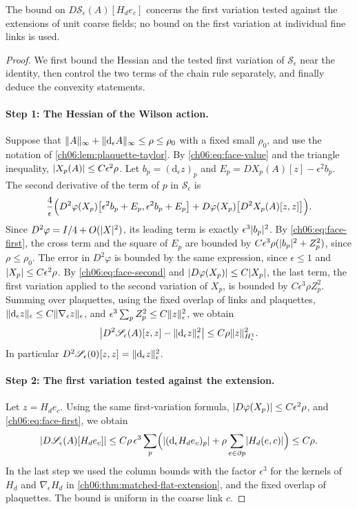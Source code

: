 The bound on $D\mathscr S_\epsilon(A)[H_de_c]$ concerns the first variation tested against the extensions of unit coarse fields; no bound on the first variation at individual fine links is used.

\begin{proof}
We first bound the Hessian and the tested first variation of $\mathscr S_\epsilon$ near the identity, then control the two terms of the chain rule separately, and finally deduce the convexity statements.

\paragraph{Step 1: The Hessian of the Wilson action.}
Suppose that $\lVert A\rVert_\infty+\lVert \mathrm d_\epsilon A\rVert_\infty\le\rho\le\rho_0$ with a fixed small $\rho_0$, and use the notation of \cref{ch06:lem:plaquette-taylor}. By \eqref{ch06:eq:face-value} and the triangle inequality, $\lvert X_p(A)\rvert\le C\epsilon^2\rho$. Let $b_p=(\mathrm d_\epsilon z)_p$ and $E_p=DX_p(A)[z]-\epsilon^2b_p$. The second derivative of the term of $p$ in $\mathscr S_\epsilon$ is
\[
 \frac4\epsilon\Bigl(D^2\varphi(X_p)\bigl[\epsilon^2b_p+E_p,\epsilon^2b_p+E_p\bigr]+D\varphi(X_p)\bigl[D^2X_p(A)[z,z]\bigr]\Bigr).
\]
Since $D^2\varphi=I/4+O(\lvert X\rvert^2)$, its leading term is exactly $\epsilon^3\lvert b_p\rvert^2$. By \eqref{ch06:eq:face-first}, the cross term and the square of $E_p$ are bounded by $C\epsilon^3\rho(\lvert b_p\rvert^2+Z_p^2)$, since $\rho\le\rho_0$. The error in $D^2\varphi$ is bounded by the same expression, since $\epsilon\le1$ and $\lvert X_p\rvert\le C\epsilon^2\rho$. By \eqref{ch06:eq:face-second} and $\lvert D\varphi(X_p)\rvert\le C\lvert X_p\rvert$, the last term, the first variation applied to the second variation of $X_p$, is bounded by $C\epsilon^3\rho Z_p^2$. Summing over plaquettes, using the fixed overlap of links and plaquettes, $\lVert \mathrm d_\epsilon z\rVert_\epsilon\le C\lVert \nabla_\epsilon z\rVert_\epsilon$, and $\epsilon^3\sum_pZ_p^2\le C\lVert z\rVert_\epsilon^2$, we obtain
\begin{equation}\label{ch06:eq:local-wilson-hessian}
 \bigl\lvert D^2\mathscr S_\epsilon(A)[z,z]-\lVert \mathrm d_\epsilon z\rVert_\epsilon^2\bigr\rvert\le C\rho\lVert z\rVert_{H^1_\epsilon}^2.
\end{equation}
In particular $D^2\mathscr S_\epsilon(0)[z,z]=\lVert \mathrm d_\epsilon z\rVert_\epsilon^2$.

\paragraph{Step 2: The first variation tested against the extension.}
Let $z=H_de_c$. Using the same first-variation formula, $\lvert D\varphi(X_p)\rvert\le C\epsilon^2\rho$, and \eqref{ch06:eq:face-first}, we obtain
\[
 \lvert D\mathscr S_\epsilon(A)[H_de_c]\rvert\le C\rho\,\epsilon^3\sum_p\Bigl(\lvert (\mathrm d_\epsilon H_de_c)_p\rvert+\rho\sum_{e\in\partial p}\lvert H_d(e,c)\rvert\Bigr)\le C\rho.
\]
In the last step we used the column bounds with the factor $\epsilon^3$ for the kernels of $H_d$ and $\nabla_\epsilon H_d$ in \cref{ch06:thm:matched-flat-extension}, and the fixed overlap of plaquettes. The bound is uniform in the coarse link $c$.


\end{proof}
